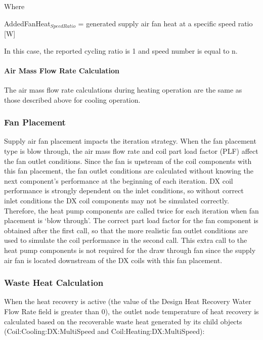 Where

AddedFanHeat\(_{SpeedRatio}\) = generated supply air fan heat at a specific speed ratio {[}W{]}

In this case, the reported cycling ratio is 1 and speed number is equal to n.

\paragraph{Air Mass Flow Rate Calculation}\label{air-mass-flow-rate-calculation-3}

The air mass flow rate calculations during heating operation are the same as those described above for cooling operation.

\subsubsection{Fan Placement}\label{fan-placement}

Supply air fan placement impacts the iteration strategy. When the fan placement type is blow through, the air mass flow rate and coil part load factor (PLF) affect the fan outlet conditions. Since the fan is upstream of the coil components with this fan placement, the fan outlet conditions are calculated without knowing the next component's performance at the beginning of each iteration. DX coil performance is strongly dependent on the inlet conditions, so without correct inlet conditions the DX coil components may not be simulated correctly. Therefore, the heat pump components are called twice for each iteration when fan placement is `blow through'. The correct part load factor for the fan component is obtained after the first call, so that the more realistic fan outlet conditions are used to simulate the coil performance in the second call. This extra call to the heat pump components is not required for the draw through fan since the supply air fan is located downstream of the DX coils with this fan placement.

\subsubsection{Waste Heat Calculation}\label{waste-heat-calculation-1}

When the heat recovery is active (the value of the Design Heat Recovery Water Flow Rate field is greater than 0), the outlet node temperature of heat recovery is calculated based on the recoverable waste heat generated by its child objects (Coil:Cooling:DX:MultiSpeed and Coil:Heating:DX:MultiSpeed):

